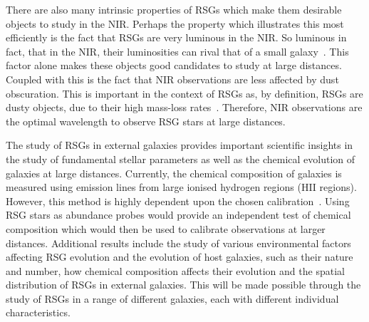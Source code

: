 There are also many intrinsic properties of RSGs which make them desirable objects to study in the NIR.
Perhaps the property which illustrates this most efficiently is the fact that RSGs are very luminous in the NIR.
So luminous in fact, that in the NIR, their luminosities can rival that of a small galaxy~\citep{2010MNRAS.407.1203D}.
This factor alone makes these objects good candidates to study at large distances.
Coupled with this is the fact that NIR observations are less affected by dust obscuration.
This is important in the context of RSGs as, by definition, RSGs are dusty objects, due to their high mass-loss rates~\citep[e.g.][]{Danchi94}.
Therefore, NIR observations are the optimal wavelength to observe RSG stars at large distances.



The study of RSGs in external galaxies provides important scientific insights in the study of fundamental stellar parameters as well as the chemical evolution of galaxies at large distances.
Currently, the chemical composition of galaxies is measured using emission lines from large ionised hydrogen regions (HII regions).
However, this method is highly dependent upon the chosen calibration~\citep[e.g.][]{Kudritzki10}.
Using RSG stars as abundance probes would provide an independent test of chemical composition which would then be used to calibrate observations at larger distances.
Additional results include the study of various environmental factors affecting RSG evolution and the evolution of host galaxies, such as their nature and number, how chemical composition affects their evolution and the spatial distribution of RSGs in external galaxies.
This will be made possible through the study of RSGs in a range of different galaxies, each with different individual characteristics.


